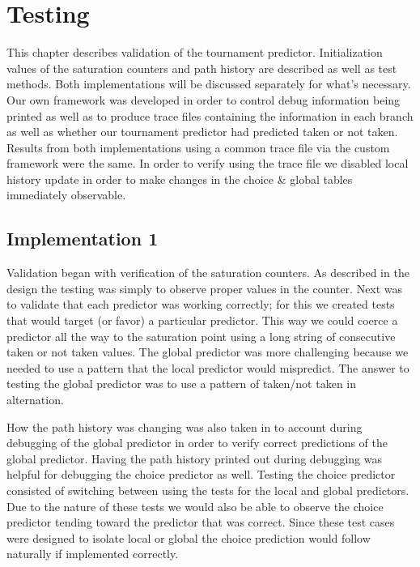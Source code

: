 \documentclass[]{report}   %
\begin{document}
\chapter{Testing}
\par{This chapter describes validation of the tournament predictor.
Initialization values of the saturation counters and path history are described as well as test methods.
Both implementations will be discussed separately for what's necessary.
Our own framework was developed in order to control debug information being printed as well as to produce trace files containing the information in each branch as well as whether our tournament predictor had predicted taken or not taken.
Results from both implementations using a common trace file via the custom framework were the same.
In order to verify using the trace file we disabled local history update in order to make changes in the choice \& global tables immediately observable.}

\section{Implementation 1}
\par{Validation began with verification of the saturation counters.
As described in the design the testing was simply to observe proper values in the counter.
Next was to validate that each predictor was working correctly; for this we created tests that would target (or favor) a particular predictor.
This way we could coerce a predictor all the way to the saturation point using a long string of consecutive taken or not taken values.
The global predictor was more challenging because we needed to use a pattern that the local predictor would mispredict.
The answer to testing the global predictor was to use a pattern of taken/not taken in alternation.}
\par{How the path history was changing was also taken in to account during debugging of the global predictor in order to verify correct predictions of the global predictor.
Having the path history printed out during debugging was helpful for debugging the choice predictor as well.
Testing the choice predictor consisted of switching between using the tests for the local and global predictors.
Due to the nature of these tests we would also be able to observe the choice predictor tending toward the predictor that was correct.
Since these test cases were designed to isolate local or global the choice prediction would follow naturally if implemented correctly.}
\end{document}
